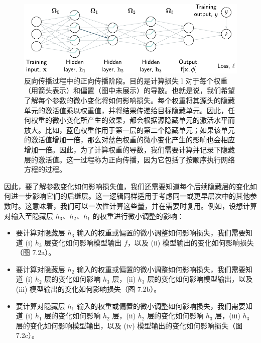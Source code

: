 \documentclass[lang=cn,newtx,10pt,scheme=chinese]{elegantbook}
\begin{document}
\begin{figure}[ht!]
\centering
\includegraphics[width=0.7\linewidth]{PDFFigures/UDLChap7PDF/Train2BPIntuitions.pdf}
\caption{反向传播过程中的正向传播阶段。目的是计算损失 l 对于每个权重（用箭头表示）和偏置（图中未展示）的导数。也就是说，我们希望了解每个参数的微小变化将如何影响损失。每个权重将其源头的隐藏单元的激活值乘以权重值，并将结果传递给目标隐藏单元。因此，任何权重的微小变化所产生的效果，都会根据源隐藏单元的激活水平而放大。比如，蓝色权重作用于第一层的第二个隐藏单元；如果该单元的激活值增加一倍，那么对蓝色权重的微小变化产生的影响也会相应增加一倍。因此，为了计算权重的导数，我们需要计算并记录下隐藏层的激活值。这一过程称为正向传播，因为它包括了按顺序执行网络方程的过程。}
\end{figure}

因此，要了解参数变化如何影响损失值，我们还需要知道每个后续隐藏层的变化如何进一步影响它们的后继层。这一逻辑同样适用于考虑同一或更早层次中的其他参数时。这意味着，我们可以一次性计算这些量，并在需要时复用。例如，设想计算对输入至隐藏层 \(h_3\)、\(h_2\)、\(h_1\) 的权重进行微小调整的影响：

\begin{itemize}
    \item 要计算对隐藏层 \(h_3\) 输入的权重或偏置的微小调整如何影响损失，我们需要知道 (i) \(h_3\) 层变化如何影响模型输出 \(f\)，以及 (ii) 模型输出的变化如何影响损失（图 7.2a）。
    \item 要计算对隐藏层 \(h_2\) 输入的权重或偏置的微小调整如何影响损失，我们需要知道 (i) \(h_2\) 层的变化如何影响 \(h_3\) 层，(ii) \(h_3\) 层的变化如何影响模型输出，以及 (iii) 模型输出的变化如何影响损失（图 7.2b）。
    \item 要计算对隐藏层 \(h_1\) 输入的权重或偏置的微小调整如何影响损失，我们需要知道 (i) \(h_1\) 层的变化如何影响 \(h_2\) 层，(ii) \(h_2\) 层的变化如何影响 \(h_3\) 层，(iii) \(h_3\) 层的变化如何影响模型输出，以及 (iv) 模型输出的变化如何影响损失（图 7.2c）。
\end{itemize}
\end{document}
